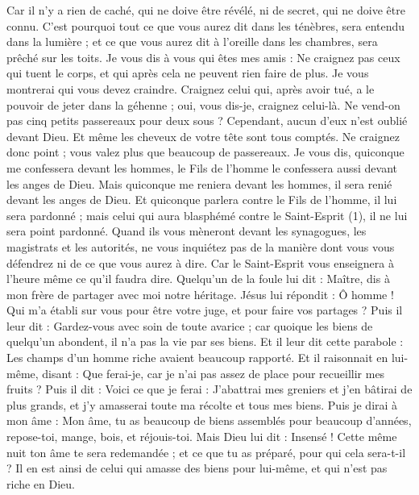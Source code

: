\begin{multicols}{2}
Car il n'y a rien de caché, qui ne doive être révélé, ni de secret, qui ne doive être connu.
C'est pourquoi tout ce que vous aurez dit dans les ténèbres, sera entendu dans la lumière ; et ce que vous aurez dit à l'oreille dans les chambres, sera prêché sur les toits.
Je vous dis à vous qui êtes mes amis : Ne craignez pas ceux qui tuent le corps, et qui après cela ne peuvent rien faire de plus.
Je vous montrerai qui vous devez craindre. Craignez celui qui, après avoir tué, a le pouvoir de jeter dans la géhenne ; oui, vous dis-je, craignez celui-là.
Ne vend-on pas cinq petits passereaux pour deux sous ? Cependant, aucun d’eux n'est oublié devant Dieu.
Et même les cheveux de votre tête sont tous comptés. Ne craignez donc point ; vous valez plus que beaucoup de passereaux.
Je vous dis, quiconque me confessera devant les hommes, le Fils de l'homme le confessera aussi devant les anges de Dieu.
Mais quiconque me reniera devant les hommes, il sera renié devant les anges de Dieu.
Et quiconque parlera contre le Fils de l'homme, il lui sera pardonné ; mais celui qui aura blasphémé contre le Saint-Esprit (1), il ne lui sera point pardonné.
Quand ils vous mèneront devant les synagogues, les magistrats et les autorités, ne vous inquiétez pas de la manière dont vous vous défendrez ni de ce que vous aurez à dire.
Car le Saint-Esprit vous enseignera à l’heure même ce qu'il faudra dire.
Quelqu'un de la foule lui dit : Maître, dis à mon frère de partager avec moi notre héritage.
Jésus lui répondit : Ô homme ! Qui m'a établi sur vous pour être votre juge, et pour faire vos partages ?
Puis il leur dit : Gardez-vous avec soin de toute avarice ; car quoique les biens de quelqu’un abondent, il n’a pas la vie par ses biens.
Et il leur dit cette parabole : Les champs d'un homme riche avaient beaucoup rapporté.
Et il raisonnait en lui-même, disant : Que ferai-je, car je n'ai pas assez de place pour recueillir mes fruits ?
Puis il dit : Voici ce que je ferai : J'abattrai mes greniers et j'en bâtirai de plus grands, et j'y amasserai toute ma récolte et tous mes biens.
Puis je dirai à mon âme : Mon âme, tu as beaucoup de biens assemblés pour beaucoup d'années, repose-toi, mange, bois, et réjouis-toi.
Mais Dieu lui dit : Insensé ! Cette même nuit ton âme te sera redemandée ; et ce que tu as préparé, pour qui cela sera-t-il ?
Il en est ainsi de celui qui amasse des biens pour lui-même, et qui n'est pas riche en Dieu.

\end{multicols}
